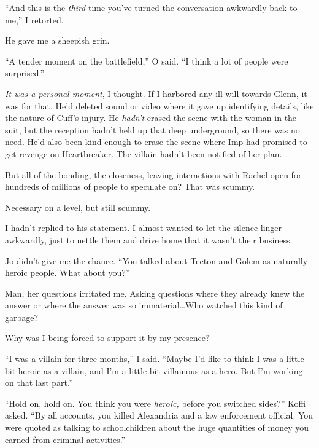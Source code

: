 ``And this is the \emph{third} time you've turned the conversation awkwardly back to me,'' I retorted.



He gave me a sheepish grin.



``A tender moment on the battlefield,'' O said.  ``I think a lot of people were surprised.''



\emph{It was a personal moment}, I thought.  If I harbored any ill will towards Glenn, it was for that.  He'd deleted sound or video where it gave up identifying details, like the nature of Cuff's injury.  He \emph{hadn't} erased the scene with the woman in the suit, but the reception hadn't held up that deep underground, so there was no need.  He'd also been kind enough to erase the scene where Imp had promised to get revenge on Heartbreaker.  The villain hadn't been notified of her plan.



But all of the bonding, the closeness, leaving interactions with Rachel open for hundreds of millions of people to speculate on?  That was scummy.



Necessary on a level, but still scummy.



I hadn't replied to his statement.  I almost wanted to let the silence linger awkwardly, just to nettle them and drive home that it wasn't their business.



Jo didn't give me the chance.  ``You talked about Tecton and Golem as naturally heroic people.  What about you?''



Man, her questions irritated me.  Asking questions where they already knew the answer or where the answer was so immaterial\ldots  Who watched this kind of garbage?



Why was I being forced to support it by my presence?



``I was a villain for three months,'' I said.  ``Maybe I'd like to think I was a little bit heroic as a villain, and I'm a little bit villainous as a hero.  But I'm working on that last part.''



``Hold on, hold on.  You think you were \emph{heroic, }before you switched sides?'' Koffi asked.  ``By all accounts, you killed Alexandria and a law enforcement official.  You were quoted as talking to schoolchildren about the huge quantities of money you earned from criminal activities.''



